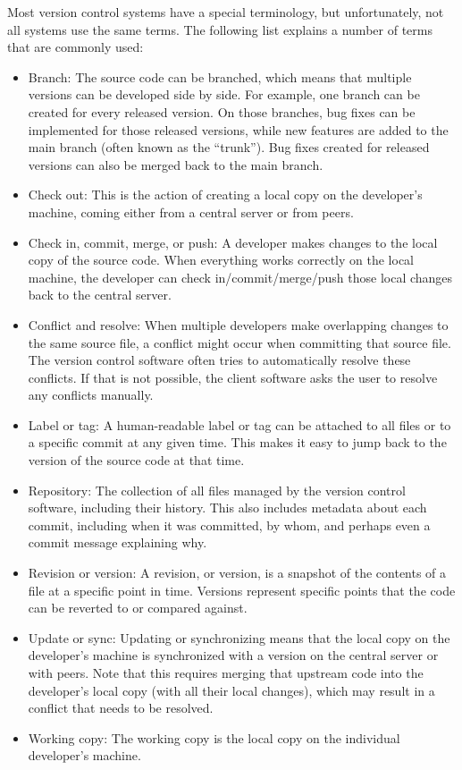 Most version control systems have a special terminology, but unfortunately, not all systems use the same terms. The following list explains a number of terms that are commonly used:

\begin{itemize}
\item
Branch: The source code can be branched, which means that multiple versions can be developed side by side. For example, one branch can be created for every released version. On those branches, bug fixes can be implemented for those released versions, while new features are added to the main branch (often known as the “trunk”). Bug fixes created for released versions can also be merged back to the main branch.

\item
Check out: This is the action of creating a local copy on the developer’s machine, coming either from a central server or from peers.

\item
Check in, commit, merge, or push: A developer makes changes to the local copy of the source code. When everything works correctly on the local machine, the developer can check in/commit/merge/push those local changes back to the central server.

\item
Conflict and resolve: When multiple developers make overlapping changes to the same source file, a conflict might occur when committing that source file. The version control software often tries to automatically resolve these conflicts. If that is not possible, the client software asks the user to resolve any conflicts manually.

\item
Label or tag: A human-readable label or tag can be attached to all files or to a specific commit at any given time. This makes it easy to jump back to the version of the source code at that time.

\item
Repository: The collection of all files managed by the version control software, including their history. This also includes metadata about each commit, including when it was committed, by whom, and perhaps even a commit message explaining why.

\item
Revision or version: A revision, or version, is a snapshot of the contents of a file at a specific point in time. Versions represent specific points that the code can be reverted to or compared against.

\item
Update or sync: Updating or synchronizing means that the local copy on the developer’s machine is synchronized with a version on the central server or with peers. Note that this requires merging that upstream code into the developer’s local copy (with all their local changes), which may result in a conflict that needs to be resolved.

\item
Working copy: The working copy is the local copy on the individual developer’s machine.
\end{itemize}

